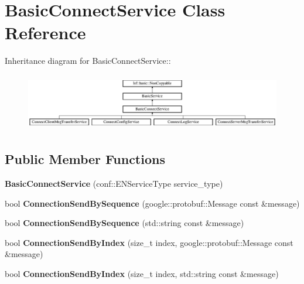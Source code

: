\hypertarget{classBasicConnectService}{
\section{BasicConnectService Class Reference}
\label{classBasicConnectService}
}
Inheritance diagram for BasicConnectService::\begin{figure}[H]
\begin{center}
\leavevmode
\includegraphics[height=2.52252cm]{classBasicConnectService}
\end{center}
\end{figure}
\subsection*{Public Member Functions}
\begin{DoxyCompactItemize}
\item 
\hypertarget{classBasicConnectService_a6b09dd735b099a6905331bb6a6893444}{
{\bfseries BasicConnectService} (conf::ENServiceType service\_\-type)}
\label{classBasicConnectService_a6b09dd735b099a6905331bb6a6893444}

\item 
\hypertarget{classBasicConnectService_af343fd1395b4a5ebdcfbcf9b58ea8ba8}{
bool {\bfseries ConnectionSendBySequence} (google::protobuf::Message const \&message)}
\label{classBasicConnectService_af343fd1395b4a5ebdcfbcf9b58ea8ba8}

\item 
\hypertarget{classBasicConnectService_aaa42010b7895660003706e97cb90d8a7}{
bool {\bfseries ConnectionSendBySequence} (std::string const \&message)}
\label{classBasicConnectService_aaa42010b7895660003706e97cb90d8a7}

\item 
\hypertarget{classBasicConnectService_a9b885099fa73b902ea2c58dc72ec9d14}{
bool {\bfseries ConnectionSendByIndex} (size\_\-t index, google::protobuf::Message const \&message)}
\label{classBasicConnectService_a9b885099fa73b902ea2c58dc72ec9d14}

\item 
\hypertarget{classBasicConnectService_a88ba8ef745819e08e0581f3f52bb9f22}{
bool {\bfseries ConnectionSendByIndex} (size\_\-t index, std::string const \&message)}
\label{classBasicConnectService_a88ba8ef745819e08e0581f3f52bb9f22}

\end{DoxyCompactItemize}
